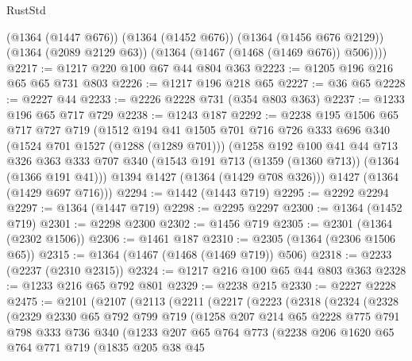 \begin{lexlean}{RustStd}
\begin{coremodule}
        (@1364 (@1447 @676))
        (@1364 (@1452 @676))
        (@1364 (@1456 @676 @2129))
        (@1364 (@2089 @2129 @63))
        (@1364 (@1467 (@1468 (@1469 @676)) @506))))
@2217 := @1217 @220 @100 @67 @44 @804 @363
@2223 := @1205 @196 @216 @65 @65 @731 @803
@2226 := @1217 @196 @218 @65
@2227 := @36 @65
@2228 := @2227 @44
@2233 := @2226 @2228 @731 (@354 @803 @363)
@2237 := @1233 @196 @65 @717 @729
@2238 := @1243 @187
@2292 := @2238
    @195
    @1506
    @65
    @717
    @727
    @719
    (@1512
      @194
      @41
      @1505
      @701
      @716
      @726
      @333
      @696
      @340
      (@1524 @701 @1527 (@1288 (@1289 @701)))
      (@1258
        @192
        @100
        @41
        @44
        @713
        @326
        @363
        @333
        @707
        @340
        (@1543 @191 @713 (@1359 (@1360 @713)) (@1364 (@1366 @191 @41)))
        @1394
        @1427
        (@1364 (@1429 @708 @326)))
      @1427
      (@1364 (@1429 @697 @716)))
@2294 := @1442 (@1443 @719)
@2295 := @2292 @2294
@2297 := @1364 (@1447 @719)
@2298 := @2295 @2297
@2300 := @1364 (@1452 @719)
@2301 := @2298 @2300
@2302 := @1456 @719
@2305 := @2301 (@1364 (@2302 @1506))
@2306 := @1461 @187
@2310 := @2305 (@1364 (@2306 @1506 @65))
@2315 := @1364 (@1467 (@1468 (@1469 @719)) @506)
@2318 := @2233 (@2237 (@2310 @2315))
@2324 := @1217 @216 @100 @65 @44 @803 @363
@2328 := @1233 @216 @65 @792 @801
@2329 := @2238 @215
@2330 := @2227 @2228
@2475 := @2101
    (@2107
      (@2113
        (@2211
          (@2217
            (@2223
              (@2318
                (@2324
                  (@2328
                    (@2329
                      @2330
                      @65
                      @792
                      @799
                      @719
                      (@1258
                        @207
                        @214
                        @65
                        @2228
                        @775
                        @791
                        @798
                        @333
                        @736
                        @340
                        (@1233
                          @207
                          @65
                          @764
                          @773
                          (@2238
                            @206
                            @1620
                            @65
                            @764
                            @771
                            @719
                            (@1835
                              @205
                              @38
                              @45

\end{coremodule}
\end{lexlean}

